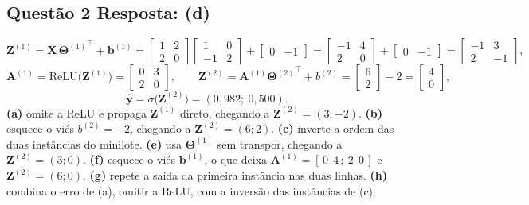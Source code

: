 \documentclass[11pt,a4paper]{article}
\begin{document}
\subsection*{Questão 2 \textemdash{} Resposta: (d)}
\[
\mathbf{Z}^{(1)} = \mathbf{X}\,{\mathbf{\Theta}^{(1)}}^{\top} + \mathbf{b}^{(1)}
= \begin{bmatrix} 1 & 2 \\ 2 & 0 \end{bmatrix}\begin{bmatrix} 1 & 0 \\ -1 & 2 \end{bmatrix} + \begin{bmatrix} 0 & -1 \end{bmatrix}
= \begin{bmatrix} -1 & 4 \\ 2 & 0 \end{bmatrix} + \begin{bmatrix} 0 & -1 \end{bmatrix}
= \begin{bmatrix} -1 & 3 \\ 2 & -1 \end{bmatrix},
\]
\[
\mathbf{A}^{(1)} = \mathrm{ReLU}\bigl(\mathbf{Z}^{(1)}\bigr) = \begin{bmatrix} 0 & 3 \\ 2 & 0 \end{bmatrix},
\qquad
\mathbf{Z}^{(2)} = \mathbf{A}^{(1)}{\mathbf{\Theta}^{(2)}}^{\top} + b^{(2)} = \begin{bmatrix} 6 \\ 2 \end{bmatrix} - 2 = \begin{bmatrix} 4 \\ 0 \end{bmatrix},
\]
\[
\hat{\mathbf{y}} = \sigma\bigl(\mathbf{Z}^{(2)}\bigr) = (0{,}982;\ 0{,}500).
\]
\textbf{(a)} omite a ReLU e propaga $\mathbf{Z}^{(1)}$ direto, chegando a $\mathbf{Z}^{(2)} = (3; -2)$.
\textbf{(b)} esquece o viés $b^{(2)} = -2$, chegando a $\mathbf{Z}^{(2)} = (6; 2)$.
\textbf{(c)} inverte a ordem das duas instâncias do minilote.
\textbf{(e)} usa $\mathbf{\Theta}^{(1)}$ sem transpor, chegando a $\mathbf{Z}^{(2)} = (3; 0)$.
\textbf{(f)} esquece o viés $\mathbf{b}^{(1)}$, o que deixa $\mathbf{A}^{(1)} = [\,0\ \ 4\,;\ 2\ \ 0\,]$ e $\mathbf{Z}^{(2)} = (6; 0)$.
\textbf{(g)} repete a saída da primeira instância nas duas linhas.
\textbf{(h)} combina o erro de (a), omitir a ReLU, com a inversão das instâncias de (c).
\end{document}
